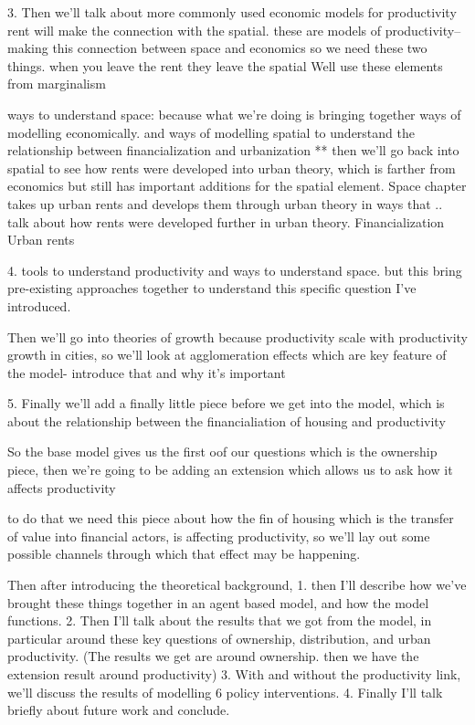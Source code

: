 3. Then we'll talk about more commonly used economic models for productivity
rent will make the connection with the spatial. 
these are models of productivity-- making this connection between space and economics so we need these two things.
when you leave the rent they leave the spatial
Well use these elements from marginalism

 ways to understand space: because what we’re doing is bringing together ways of modelling economically. and ways of modelling spatial to understand the relationship between financialization and urbanization **
then we'll go back into spatial to see how rents were developed into urban theory, which is farther from economics but still has important additions for the spatial element. 
Space chapter takes up urban rents and develops them through urban theory in ways that .. talk about how rents were developed further in urban theory.
Financialization
Urban rents

4. tools to understand productivity and ways to understand space. but this bring pre-existing approaches together to understand this specific question I've introduced.


Then we'll go into theories of growth because productivity scale with productivity growth in cities, so we'll look at agglomeration effects which are key feature of the model- introduce that and why it's important

5. Finally  we'll add a finally little piece before we get  into the model,  which is about the relationship between the financialiation of housing and productivity

So the base model gives us the first oof our questions which is the ownership piece, then we're going to be adding an extension which allows us to ask how it affects productivity

to do that we need this piece about how the fin of housing which is the transfer of value into financial actors, is affecting productivity, so we'll lay out some possible channels through which that effect may be happening.

Then  after introducing the theoretical background, 
1. then I'll describe how we've brought these things together in an agent based model, and how the model functions. 
2. Then I'll talk about the results that we got from the model, in particular around these key questions of ownership, distribution, and urban productivity.  (The results we get  are around ownership. then we have the extension result around productivity) 
3. With and without the productivity link, we'll discuss the results of modelling 6 policy interventions. 
4. Finally I'll talk briefly about future work and conclude. 





